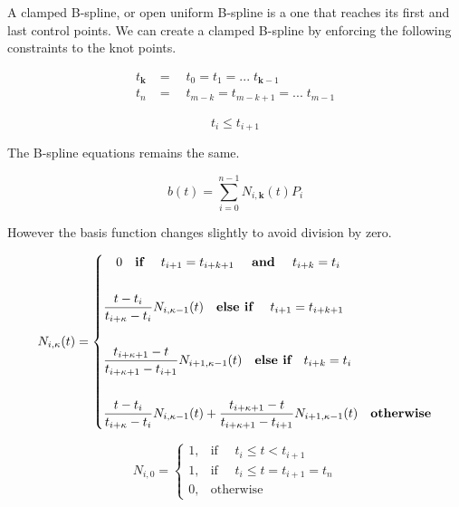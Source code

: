 \documentclass{article}
\begin{document}
A clamped B-spline, or open uniform B-spline is a one that reaches its first and last control points. We can create a clamped B-spline by enforcing the following constraints to the knot points.

\begin{equation}
\begin{aligned}
    t_\textbf{k} & = \quad t_0 = t_1 = ... \; t_{\textbf{k}-1} \\
    t_n & = \quad  t_{m-k} = t_{m-k+1} = ... \; t_{m-1}
\end{aligned}
\end{equation}

\begin{equation}
    t_i \leq t_{i+1}
\end{equation}

The B-spline equations remains the same.

  \begin{equation} \label{eq:B-Spline equation}
      b(t) = \sum^{n-1}_{i=0} N_{i,\textbf{k}}(t) P_i
  \end{equation}

However the basis function changes slightly to avoid division by zero.


  \begin{equation} \label{eq:Basis function equation}
  N_{i,\kappa}(t) = \begin{dcases}  \quad 0 \quad  \textbf{if } \quad t_{i+1} = t_{i+k+1} \quad  \textbf{ and } \quad t_{i+k} = t_{i} \\  \\ \frac{t - t_i}{t_{i+\kappa} - t_i} N_{i,\kappa-1}(t) \quad  \textbf{else if } \quad t_{i+1} = t_{i+k+1} \\ \\ 
  \frac{t_{i+\kappa+1} - t}{t_{i+\kappa+1}-t_{i+1}} N_{i+1 , \kappa-1}(t) \quad \textbf{else if} \quad t_{i+k} = t_{i} \\ \\
  \frac{t - t_i}{t_{i+\kappa} - t_i} N_{i,\kappa-1}(t) + \frac{t_{i+\kappa+1} - t}{t_{i+\kappa+1}-t_{i+1}} N_{i+1 , \kappa-1}(t) \quad \textbf{otherwise}
  \end{dcases}
  \end{equation}
  
 \hspace{1cm}
 
 \begin{equation} \label{eq:Basis function equation zeros}
      N_{i,0} =   \begin{cases} 1, &  \text{if } \quad t_i \leq t < t_{i+1} \\
                            1, & \text{if } \quad t_i \leq t = t_{i+1} = t_n \\
                            0, & \text{otherwise} \end{cases}
  \end{equation}
  
\end{document}
